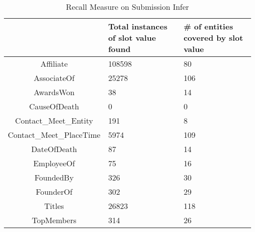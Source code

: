 \begin{table}
\caption{Recall Measure on Submission Infer }
\centering
\begin{tabular}{|c|p{3cm}|p{4cm}|}
\hline 
 & Total instances of slot value found & \# of entities covered by slot value \\ 
\hline 
Affiliate & 108598 & 80 \\ \hline 
AssociateOf & 25278 & 106 \\ \hline 
AwardsWon & 38 & 14 \\ \hline 
CauseOfDeath & 0 & 0 \\ \hline 
Contact\_Meet\_Entity & 191 & 8 \\ \hline 
Contact\_Meet\_PlaceTime & 5974 & 109 \\ \hline 
DateOfDeath & 87 & 14 \\ \hline 
EmployeeOf & 75 & 16 \\ \hline 
FoundedBy & 326 & 30 \\ \hline 
FounderOf & 302 &  29 \\ \hline 
Titles & 26823 & 118 \\ \hline 
TopMembers & 314 & 26 \\ \hline 

\end{tabular} 
\end{table}


